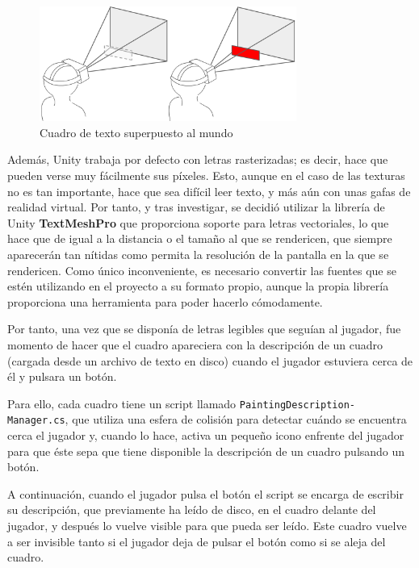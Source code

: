\begin{figure}[!h]
\begin{center}
\includegraphics[width=0.75\textwidth]{imagenes/7/camera-overlay.png}
\caption{Cuadro de texto superpuesto al mundo}
\label{fig:camera-overlay}
\end{center}
\end{figure}

Además, Unity trabaja por defecto con letras rasterizadas; es decir, hace que pueden verse muy fácilmente sus píxeles. Esto, aunque en el caso de las texturas no es tan importante, hace que sea difícil leer texto, y más aún con unas gafas de realidad virtual. Por tanto, y tras investigar, se decidió utilizar la librería de Unity \textbf{TextMeshPro} que proporciona soporte para letras vectoriales, lo que hace que de igual a la distancia o el tamaño al que se rendericen, que siempre aparecerán tan nítidas como permita la resolución de la pantalla en la que se rendericen. Como único inconveniente, es necesario convertir las fuentes que se estén utilizando en el proyecto a su formato propio, aunque la propia librería proporciona una herramienta para poder hacerlo cómodamente.

Por tanto, una vez que se disponía de letras legibles que seguían al jugador, fue momento de hacer que el cuadro apareciera con la descripción de un cuadro (cargada desde un archivo de texto en disco) cuando el jugador estuviera cerca de él y pulsara un botón.

Para ello, cada cuadro tiene un script llamado \texttt{PaintingDescription-} \texttt{Manager.cs}, que utiliza una esfera de colisión para detectar cuándo se encuentra cerca el jugador y, cuando lo hace, activa un pequeño icono enfrente del jugador para que éste sepa que tiene disponible la descripción de un cuadro pulsando un botón.

A continuación, cuando el jugador pulsa el botón el script se encarga de escribir su descripción, que previamente ha leído de disco, en el cuadro delante del jugador, y después lo vuelve visible para que pueda ser leído. Este cuadro vuelve a ser invisible tanto si el jugador deja de pulsar el botón como si se aleja del cuadro.

